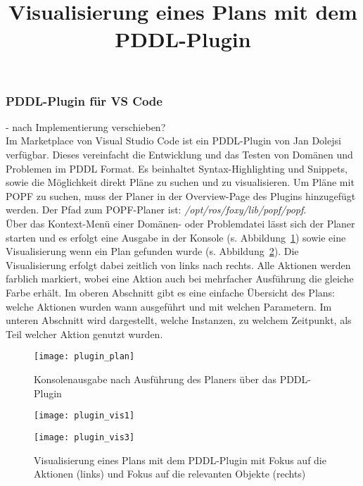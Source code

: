 \subsubsection{PDDL-Plugin für VS Code}
- nach Implementierung verschieben?\\
Im Marketplace von Visual Studio Code ist ein PDDL-Plugin von Jan Dolejsi verfügbar.
Dieses vereinfacht die Entwicklung und das Testen von Domänen und Problemen im PDDL Format.
Es beinhaltet Syntax-Highlighting und Snippets, sowie die Möglichkeit direkt Pläne zu suchen und zu visualisieren.
Um Pläne mit \ac{POPF} zu suchen, muss der Planer in der Overview-Page des Plugins hinzugefügt werden.
Der Pfad zum \ac{POPF}-Planer ist: \emph{/opt/ros/foxy/lib/popf/popf}.\\
Über das Kontext-Menü einer Domänen- oder Problemdatei lässt sich der Planer starten und es erfolgt eine Ausgabe in der Konsole (s. Abbildung~\ref{fig:pluginplan}) sowie eine Visualisierung wenn ein Plan gefunden wurde (s. Abbildung~\ref{fig:pluginvis}).
Die Visualisierung erfolgt dabei zeitlich von links nach rechts.
Alle Aktionen werden farblich markiert, wobei eine Aktion auch bei mehrfacher Ausführung die gleiche Farbe erhält.
Im oberen Abschnitt gibt es eine einfache Übersicht des Plans: welche Aktionen wurden wann ausgeführt und mit welchen Parametern.
Im unteren Abschnitt wird dargestellt, welche Instanzen, zu welchem Zeitpunkt, als Teil welcher Aktion genutzt wurden.
\begin{figure}[ht!]
    \centering
    \texttt{[image: plugin\_plan]}
    \caption{Konsolenausgabe nach Ausführung des Planers über das PDDL-Plugin}
    \label{fig:pluginplan}
\end{figure}

\begin{figure}[ht!]
    \centering
    \begin{minipage}[t]{0.45\linewidth}
        \centering
        \texttt{[image: plugin\_vis1]}
    \end{minipage}%
    \hfill
    \begin{minipage}[t]{0.45\linewidth}
        \centering
        \texttt{[image: plugin\_vis3]}
    \end{minipage}
    \title{Visualisierung eines Plans mit dem PDDL-Plugin}
    \caption{Visualisierung eines Plans mit dem PDDL-Plugin mit Fokus auf die Aktionen (links) und Fokus auf die relevanten Objekte (rechts)}
    \label{fig:pluginvis}
\end{figure}
